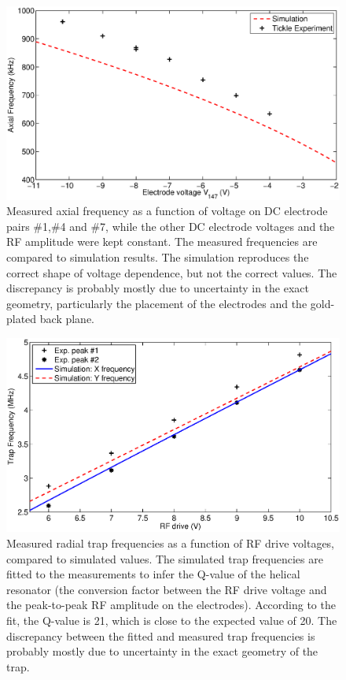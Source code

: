 \begin{figure}[h!t]
\centering
\includegraphics[width=13.5cm]{chapter6/tickle/axialtickle}
\caption[Axial trap frequency]{Measured axial frequency as a function of voltage on DC electrode pairs \#1,\#4 and \#7, while the other DC electrode voltages and the RF amplitude were kept constant. The measured frequencies are compared to simulation results. The simulation reproduces the correct shape of voltage dependence, but not the correct values. The discrepancy is probably mostly due to uncertainty in the exact geometry, particularly the placement of the electrodes and the gold-plated back plane.}
\label{fig:axialtickle}
\end{figure} 

\begin{figure}[h!t]
\centering
\includegraphics[width=13.5cm]{chapter6/tickle/radialtickle_drive}
\caption[Radial trap frequencies]{Measured radial trap frequencies as a function of RF drive voltages, compared to simulated values. The simulated trap frequencies are fitted to the measurements to infer the Q-value of the helical resonator (the conversion factor between the RF drive voltage and the peak-to-peak RF amplitude on the electrodes). According to the fit, the Q-value is 21, which is close to the expected value of 20. The discrepancy between the fitted and measured trap frequencies is probably mostly due to uncertainty in the exact geometry of the trap.}
\label{fig:radialtickle}
\end{figure} 




